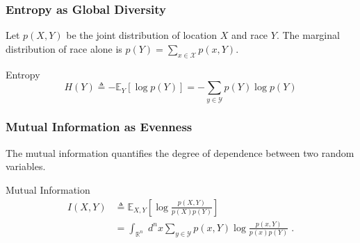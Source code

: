 \documentclass{beamer}
\begin{document}
	\iflong
	\begin{frame}\frametitle{Entropy as Global Diversity}
		Let $p(X,Y)$ be the joint distribution of location $X$ and race $Y$. The marginal distribution of race alone is $p(Y) = \sum_{x \in \mathcal{X}} p(x,Y)$. 
		\begin{block}{Entropy}
			\begin{equation*}
				H(Y) \triangleq - \mathbb{E}_Y[\log p(Y)] = -\sum_{y \in \mathcal{Y}} p(Y)\log p(Y)
			\end{equation*}
		\end{block}
	\end{frame}
	\begin{frame}\frametitle{Mutual Information as Evenness}
		The mutual information quantifies the degree of dependence between two random variables.
		\begin{block}{Mutual Information}
			\begin{align*}
				I(X,Y) &\triangleq \mathbb{E}_{X,Y}\left[\log \frac{p(X,Y)}{p(X)p(Y)}\right] \\
				&= \int_{\mathbb{R}^n} \; d^nx  \sum_{y \in \mathcal{Y}} p(x,Y) \log \frac{p(x,Y)}{p(x)p(Y)}\;.
			\end{align*}	
		\end{block}
	\end{frame}
\end{document}
